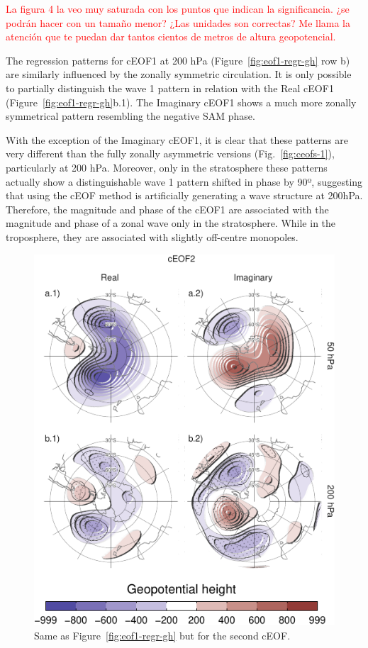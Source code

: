 \documentclass[smallextended]{svjour3}       %
\begin{document}
\textcolor{red}{La figura 4 la veo muy saturada con los puntos que indican la significancia. ¿se podrán hacer con un tamaño menor? ¿Las unidades son correctas? Me llama la atención que te puedan dar tantos cientos de metros de altura geopotencial.}

The regression patterns for cEOF1 at 200 hPa (Figure~\ref{fig:eof1-regr-gh} row b) are similarly influenced by the zonally symmetric circulation.
It is only possible to partially distinguish the wave 1 pattern in relation with the Real cEOF1 (Figure~\ref{fig:eof1-regr-gh}b.1).
The Imaginary cEOF1 shows a much more zonally symmetrical pattern resembling the negative SAM phase.

With the exception of the Imaginary cEOF1, it is clear that these patterns are very different than the fully zonally asymmetric versions (Fig.~\ref{fig:ceofs-1}), particularly at 200 hPa.
Moreover, only in the stratosphere these patterns actually show a distinguishable wave 1 pattern shifted in phase by 90º, suggesting that using the cEOF method is artificially generating a wave structure at 200hPa.
Therefore, the magnitude and phase of the cEOF1 are associated with the magnitude and phase of a zonal wave only in the stratosphere.
While in the troposphere, they are associated with slightly off-centre monopoles.



\begin{figure}
\centering
\includegraphics{../figures/eof2-regr-gh-1.pdf}
\caption{\label{fig:eof2-regr-gh}Same as Figure~\ref{fig:eof1-regr-gh} but for the second cEOF.}
\end{figure}
\end{document}
